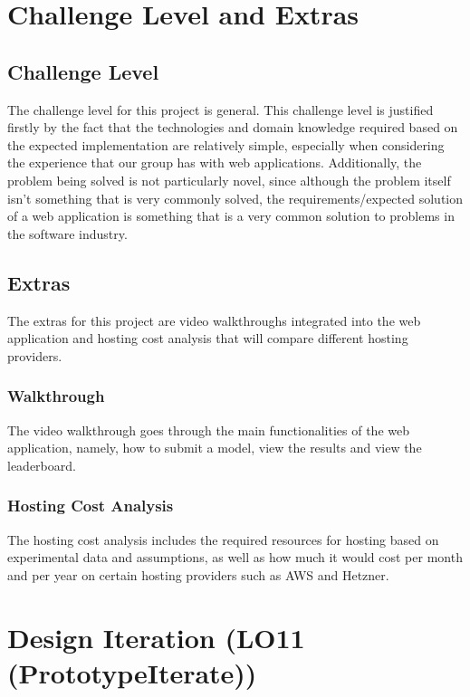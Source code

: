 \documentclass{article}
\begin{document}
\section{Challenge Level and Extras}

\subsection{Challenge Level}

The challenge level for this project is general. This challenge level is justified firstly by the fact that the technologies and domain knowledge required based on the expected implementation are relatively simple, especially when considering the experience that our group has with web applications. Additionally, the problem being solved is not particularly novel, since although the problem itself isn’t something that is very commonly solved, the requirements/expected solution of a web application is something that is a very common solution to problems in the software industry. 

\subsection{Extras}

The extras for this project are video walkthroughs integrated into the web application and hosting cost analysis that will compare different hosting providers.

\subsubsection{Walkthrough}
The video walkthrough goes through the main functionalities of the web application, namely, how to submit a model, view the results and view the leaderboard. 

\subsubsection{Hosting Cost Analysis}
The hosting cost analysis includes the required resources for hosting based on experimental data and assumptions, as well as how much it would cost per month and per year on certain hosting providers such as AWS and Hetzner.

\section{Design Iteration (LO11 (PrototypeIterate))}
\end{document}
